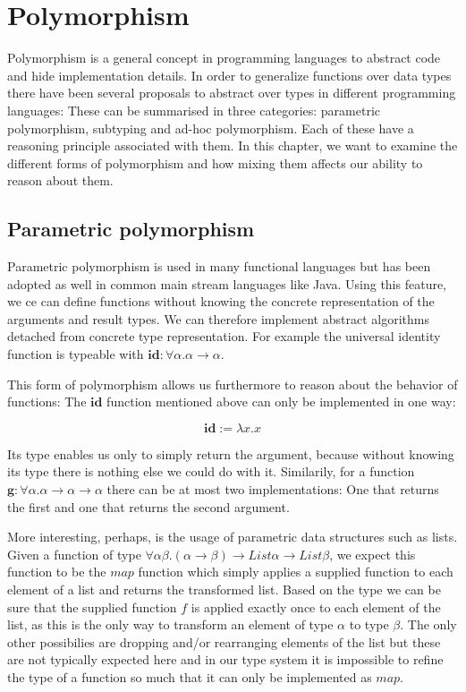 \chapter{Polymorphism}\label{ch:polymorphism}

Polymorphism is a general concept in programming languages to abstract code and hide implementation details.
In order to generalize functions over data types there have been several proposals to abstract over types in different programming languages:
These can be summarised in three categories: parametric polymorphism, subtyping and ad-hoc polymorphism.
Each of these have a reasoning principle associated with them.
In this chapter, we want to examine the different forms of polymorphism and how mixing them affects our ability to reason about them.

\section{Parametric polymorphism}\label{sec:parmetric-polymorphism}

Parametric polymorphism is used in many functional languages but has been adopted as well in common main stream languages like Java.
Using this feature, we ce can define functions without knowing the concrete representation of the arguments and result types.
We can therefore implement abstract algorithms detached from concrete type representation.
For example the universal identity function is typeable with $\mathbf{id} : \forall \alpha. \alpha \to \alpha$.

This form of polymorphism allows us furthermore to reason about the behavior of functions:
The $\mathbf{id}$ function mentioned above can only be implemented in one way:

$$
  \mathbf{id} := \lambda x.x
$$

Its type enables us only to simply return the argument, because without knowing its type there is nothing else we could do with it.
Similarily, for a function $\mathbf{g} : \forall \alpha. \alpha \to \alpha \to \alpha$ there can be at most two implementations:
One that returns the first and one that returns the second argument.

More interesting, perhaps, is the usage of parametric data structures such as lists.
Given a function of type $\forall \alpha \beta. (\alpha \to \beta) \to \mathit{List } \alpha \to \mathit{List } \beta$, we expect this function to be the $\mathit{map}$ function which simply applies a supplied function to each element of a list and returns the transformed list.
Based on the type we can be sure that the supplied function $f$ is applied exactly once to each element of the list, as this is the only way to transform an element of type $\alpha$ to type $\beta$.
The only other possibilies are dropping and/or rearranging elements of the list but these are not typically expected here and in our type system it is impossible to refine the type of a function so much that it can only be implemented as $\mathit{map}$.

